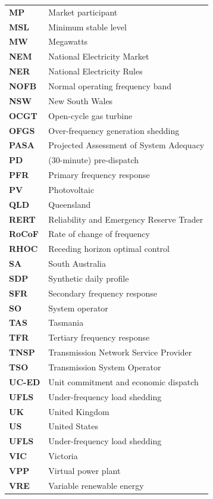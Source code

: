 \documentclass[12pt,a4paper,]{report}
\begin{document}
\begin{longtable}[l]{l l}
\textbf{MP} & Market participant \\
\textbf{MSL} & Minimum stable level \\
\textbf{MW} & Megawatts \\
\textbf{NEM} & National Electricity Market \\
\textbf{NER} & National Electricity Rules \\
\textbf{NOFB} & Normal operating frequency band \\
\textbf{NSW} & New South Wales \\
\textbf{OCGT} & Open-cycle gas turbine \\
\textbf{OFGS} & Over-frequency generation shedding \\
\textbf{PASA} & Projected Assessment of System Adequacy \\
\textbf{PD} & (30-minute) pre-dispatch \\
\textbf{PFR} & Primary frequency response \\
\textbf{PV} & Photovoltaic \\
\textbf{QLD} & Queensland \\
\textbf{RERT} & Reliability and Emergency Reserve Trader \\
\textbf{RoCoF} & Rate of change of frequency \\
\textbf{RHOC} & Receding horizon optimal control \\
\textbf{SA} &  South Australia \\
\textbf{SDP} & Synthetic daily profile \\
\textbf{SFR} & Secondary frequency response \\
\textbf{SO} & System operator \\
\textbf{TAS} & Tasmania \\
\textbf{TFR} & Tertiary frequency response \\
\textbf{TNSP} & Transmission Network Service Provider \\
\textbf{TSO} & Transmission System Operator \\
\textbf{UC-ED} & Unit commitment and economic dispatch \\
\textbf{UFLS} & Under-frequency load shedding \\
\textbf{UK} & United Kingdom \\
\textbf{US} & United States \\
\textbf{UFLS} & Under-frequency load shedding \\
\textbf{VIC} & Victoria \\
\textbf{VPP} & Virtual power plant \\
\textbf{VRE} & Variable renewable energy \\
\end{longtable}
\end{document}
